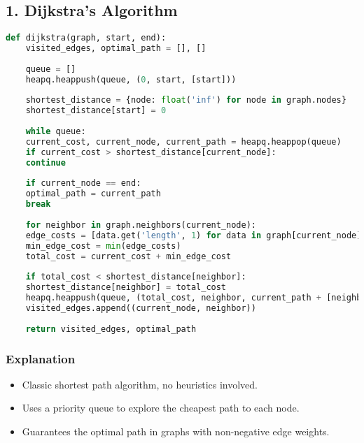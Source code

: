 \subsection*{1. Dijkstra's Algorithm}
\begin{lstlisting}[language=Python, caption=Classical Dijkstra’s Algorithm]
	def dijkstra(graph, start, end):
	visited_edges, optimal_path = [], []
	
	queue = []
	heapq.heappush(queue, (0, start, [start]))
	
	shortest_distance = {node: float('inf') for node in graph.nodes}
	shortest_distance[start] = 0
	
	while queue:
	current_cost, current_node, current_path = heapq.heappop(queue)
	if current_cost > shortest_distance[current_node]:
	continue
	
	if current_node == end:
	optimal_path = current_path
	break
	
	for neighbor in graph.neighbors(current_node):
	edge_costs = [data.get('length', 1) for data in graph[current_node][neighbor].values()]
	min_edge_cost = min(edge_costs)
	total_cost = current_cost + min_edge_cost
	
	if total_cost < shortest_distance[neighbor]:
	shortest_distance[neighbor] = total_cost
	heapq.heappush(queue, (total_cost, neighbor, current_path + [neighbor]))
	visited_edges.append((current_node, neighbor))
	
	return visited_edges, optimal_path
\end{lstlisting}

\subsubsection*{Explanation}
\begin{itemize}
	\item Classic shortest path algorithm, no heuristics involved.
	\item Uses a priority queue to explore the cheapest path to each node.
	\item Guarantees the optimal path in graphs with non-negative edge weights.
\end{itemize}

